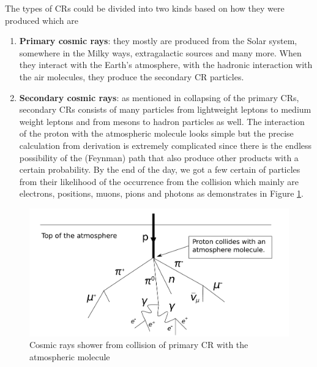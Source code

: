 The types of CRs could be divided into two kinds based on
how they were produced which are
\begin{enumerate}
    \item \textbf{Primary cosmic rays}: they mostly are produced from the
    Solar system, somewhere in the Milky ways, extragalactic sources and many more. When they interact with the Earth's atmosphere,
    with the hadronic interaction with the air molecules,
    they produce the secondary CR particles.
    \item \textbf{Secondary cosmic rays}: as mentioned in collapsing of the  
    primary CRs, secondary CRs consists of many particles
    from lightweight leptons to medium weight leptons and 
    from mesons to hadron particles as well. The interaction
    of the proton with the atmospheric molecule looks simple 
    but the precise calculation from derivation is extremely complicated 
    since there is the endless possibility of the (Feynman) path that 
    also produce other products with a certain probability.
    By the end of the day, we got a few certain 
    of particles from their likelihood of the occurrence from 
    the collision which mainly are electrons, positions, muons,
    pions and photons as demonstrates in Figure \ref{fig:cr_shower}.
\end{enumerate}

\begin{figure}[h!]
    \centering
    \includegraphics[width=\textwidth]{content/background/figures/Atmospheric_Collision.pdf}
    \caption{Cosmic rays shower from collision of primary CR with the atmospheric molecule
    }
    \label{fig:cr_shower}
\end{figure}


